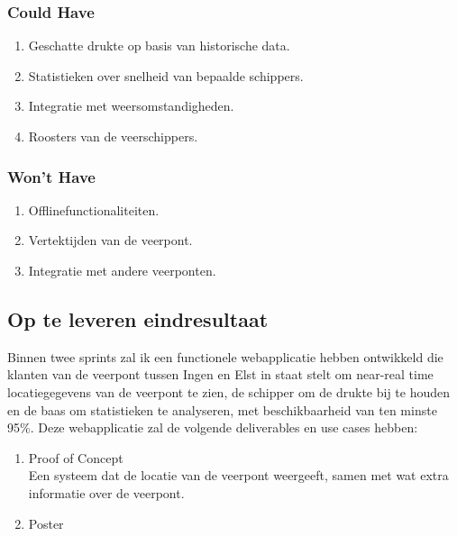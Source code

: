 \documentclass{article}
\begin{document}
\subsubsection{Could Have}
\begin{enumerate}
    \item Geschatte drukte op basis van historische data.
    \item Statistieken over snelheid van bepaalde schippers.
    \item Integratie met weersomstandigheden.
    \item Roosters van de veerschippers.
\end{enumerate}
\subsubsection{Won't Have}
\begin{enumerate}
    \item Offlinefunctionaliteiten.
    \item Vertektijden van de veerpont.
    \item Integratie met andere veerponten.
\end{enumerate}

\subsection{Op te leveren eindresultaat}

Binnen twee sprints zal ik een functionele webapplicatie hebben ontwikkeld die klanten van de veerpont tussen Ingen en Elst in staat stelt om near-real time locatiegegevens van de veerpont te zien, de schipper om de drukte bij te houden en de baas om statistieken te analyseren, met beschikbaarheid van ten minste 95\%.
Deze webapplicatie zal de volgende deliverables en use cases hebben:
\begin{tcolorbox}[colback=white, colframe=black, title=\textbf{Deliverables}]
\begin{enumerate}
    \item Proof of Concept \\ Een systeem dat de locatie van de veerpont weergeeft, samen met wat extra informatie over de veerpont.
    \item Poster 
\end{enumerate}
\end{tcolorbox}
\end{document}
